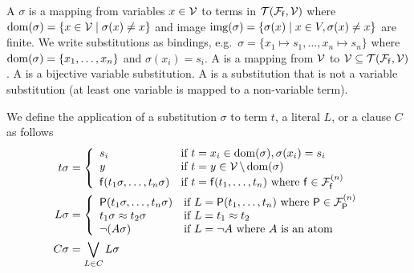 


\begin{definition}\label{def:substitution}
	A  \( \sigma \) is a mapping from variables \( x\in\mathcal{V} \) to terms in \( {\mathcal{T}(\mathcal{F}_{\mathsf{f}},\mathcal{V})} \)
	where \( \operatorname{dom}(\sigma) = \{ x\in\mathcal{V}\mid\sigma(x) \neq x \} \)
	and image \( \operatorname{img}(\sigma) =\{ \sigma(x) \mid x\in V, \sigma(x)\neq x \} \) are finite.
	We write substitutions as bindings, e.g.~\( \sigma=\{ x_1\mapsto s_1,\ldots,x_n\mapsto s_n \} \)
	where \( \operatorname{dom}(\sigma)=\{ x_1,\ldots,x_n \} \) and \( \sigma(x_i)=s_i \).
	A  is a mapping from \( \mathcal{V} \) to \( \mathcal{V}\subseteq{\mathcal{T}(\mathcal{F}_{\mathsf{f}},\mathcal{V})} \).
	A  is a bijective variable substitution.
	A  is a substitution that is not a variable substitution
	(at least one variable is mapped to a non-variable term).
\end{definition}
\begin{definition}
	We define the application of a substitution \( \sigma \)
	to term \( t \), a literal \( L \), or a clause \( C \) as follows
	\begin{align*}
	t\sigma &=
	\left \{
		\begin{array}{ll}
			s_i & \text{if }t=x_i\in\operatorname{dom}(\sigma), \sigma(x_i) = s_i
			\\
			y & \text{if }t=y\in\mathcal{V} \, \backslash\operatorname{dom}(\sigma)
			\\
			\mathsf{f}(t_1\sigma,\ldots,t_n\sigma)	&\text{if }t=\mathsf{f}(t_1,\ldots,t_n)
			\text{ where  }\mathsf{f}\in{\mathcal{F}^{(n)}_{\mathsf{f}}}
		\end{array}
	\right.
			 \\
	L\sigma{} &=
	\left \{
		\begin{array}{ll}
			\mathsf{P}(t_1\sigma,\ldots,t_n\sigma)
			&\text{if }L=\mathsf{P}(t_1,\ldots,t_n)
			\text{ where  }\mathsf{P}\in{\mathcal{F}^{(n)}_{\mathsf{P}}}
			\\
			t_1\sigma\approx t_2\sigma
			&\text{if } L = t_1\approx t_2
			\\
			\lnot(A\sigma)&\text{if } L=\lnot A\text{ where }A\text{ is an atom}
		\end{array}
	\right.
	\\
	C \sigma{} &=
\bigvee_{
	L\in{} C
}
	L \sigma{}
	\end{align*}
\end{definition}

